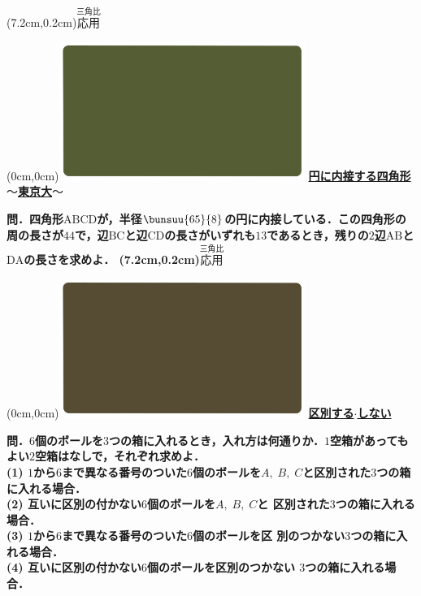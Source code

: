 \documentclass[10pt,
fleqn,
dvipdfmx,
uplatex
]{jsarticle}
\begin{document}
\at(7.2cm,0.2cm){\small\color{bradorange}$\overset{\text{三角比}}{\text{応用}}$}

\newpage

\at(0cm,0cm){\includegraphics[width=8cm,bb=0 0 1920 1080]{./youtube/thumbnails/templates/smart_background/三角比.jpeg}}
{\color{orange}\bf\boldmath\Large\underline{円に内接する四角形$〜$東京大$〜$}}\vspace{0.3zw}

\Large 
\bf\boldmath 問．四角形$\text{ABCD}$が，半径$\bunsuu{{{65}}}{8}$の円に内接している．この四角形の周の長さが${44}$で，辺$\text{BC}$と辺$\text{CD}$の長さがいずれも${13}$であるとき，残りの$2$辺$\text{AB}$と$\text{DA}$の長さを求めよ．
\at(7.2cm,0.2cm){\small\color{bradorange}$\overset{\text{三角比}}{\text{応用}}$}



\newpage



\at(0cm,0cm){\includegraphics[width=8cm,bb=0 0 1920 1080]{./youtube/thumbnails/templates/smart_background/場合の数.jpeg}}
{\color{orange}\bf\boldmath\huge\underline{区別する$\cdot$しない}}\vspace{0.3zw}

\scriptsize 
\bf\boldmath 問．$6$個のボールを$3$つの箱に入れるとき，入れ方は何通りか．$1$空箱があってもよい$2$空箱はなしで，それぞれ求めよ．\\
(1)  $1$から$6$まで異なる番号のついた$6$個のボールを$A,\;B,\;C$と区別された$3$つの箱に入れる場合．\\
(2)  互いに区別の付かない$6$個のボールを$A,\;B,\;C$と
区別された$3$つの箱に入れる場合．\\
(3)  $1$から$6$まで異なる番号のついた$6$個のボールを区
別のつかない$3$つの箱に入れる場合．\\
(4)  互いに区別の付かない$6$個のボールを区別のつかない
$3$つの箱に入れる場合．\\
\end{document}
